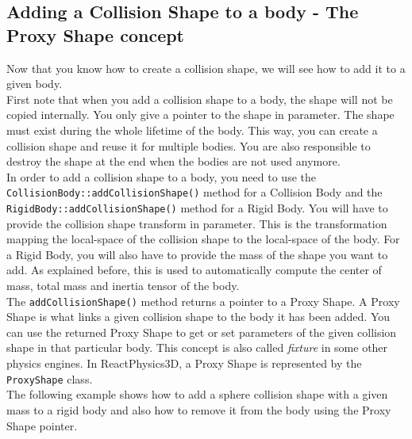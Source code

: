 \documentclass[a4paper,12pt]{article}
\begin{document}
    \subsection{Adding a Collision Shape to a body - The Proxy Shape concept}

    \begin{sloppypar}
    Now that you know how to create a collision shape, we will see how to add it to a given body. \\

    First note that when you add a collision shape to a body, the shape will not be copied internally. You only give a
    pointer to the shape in parameter. The shape must exist during the whole lifetime of the body. This way, you can
    create a collision shape and reuse it for multiple bodies. You are also responsible to destroy the shape at the
    end when the bodies are not used anymore. \\

   In order to add a collision shape to a body, you need to use the \texttt{CollisionBody::addCollisionShape()} method for a Collision Body and the
   \texttt{RigidBody::addCollisionShape()} method for a Rigid Body. You will have to provide the collision shape transform in parameter. This is the
   transformation mapping the local-space of the collision shape to the local-space of the body. For a Rigid Body, you will also have to provide the
   mass of the shape you want to add. As explained before, this is used to automatically compute the center of mass, total mass and inertia tensor of the body. \\

   The \texttt{addCollisionShape()} method returns a pointer to a Proxy Shape. A Proxy Shape is what links a given collision shape to the body it has been added.
   You can use the returned Proxy Shape to get or set parameters of the given collision shape in that particular body. This concept is also called \emph{fixture} in some
   other physics engines. In ReactPhysics3D, a Proxy Shape is represented by the \texttt{ProxyShape} class. \\

    The following example shows how to add a sphere collision shape with a given mass to a rigid body and also how to remove it from the body using the Proxy Shape pointer. \\
    \end{sloppypar}
\end{document}

